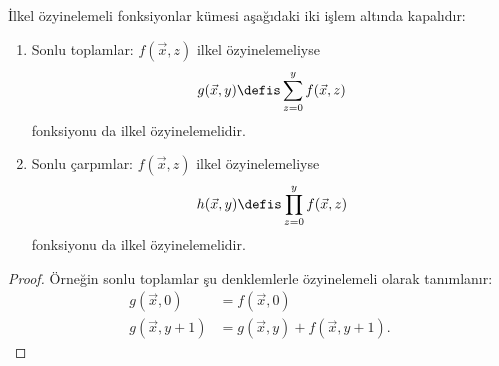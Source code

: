 \documentclass[../../../include/open-logic-section]{subfiles}
\begin{document}
\begin{prop}
İlkel özyinelemeli fonksiyonlar kümesi aşağıdaki iki işlem altında kapalıdır:
\begin{enumerate}
\item Sonlu toplamlar: $f(\vec x,z)$ ilkel özyinelemeliyse
\[
  g(\vec x,y)\defis\sum_{z=0}^{y}f(\vec x,z)
\]
fonksiyonu da ilkel özyinelemelidir.
\item Sonlu çarpımlar: $f(\vec x,z)$ ilkel özyinelemeliyse
\[
  h(\vec x,y)\defis\prod_{z=0}^{y}f(\vec x,z)
\]
fonksiyonu da ilkel özyinelemelidir.
\end{enumerate}
\end{prop}

\begin{proof}
Örneğin sonlu toplamlar şu denklemlerle özyinelemeli olarak tanımlanır:
\begin{align*}
  g(\vec x,0) & = f(\vec x,0)\\
  g(\vec x,y+1) & = g(\vec x,y)+f(\vec x,y+1).
\end{align*}
\end{proof}
\end{document}
